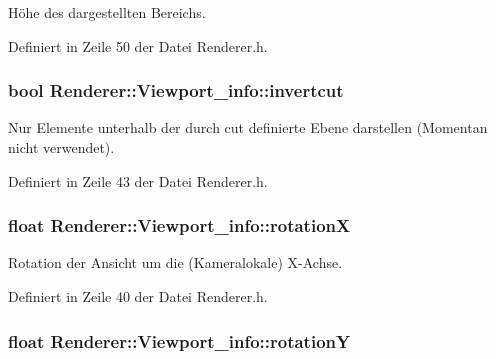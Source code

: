 Höhe des dargestellten Bereichs. 



Definiert in Zeile 50 der Datei Renderer.\-h.

\hypertarget{structRenderer_1_1Viewport__info_a0e06e17e13e9639179de762f6a45c71e}{
\subsubsection[{invertcut}]{\setlength{\rightskip}{0pt plus 5cm}bool Renderer\-::\-Viewport\-\_\-info\-::invertcut}}\label{structRenderer_1_1Viewport__info_a0e06e17e13e9639179de762f6a45c71e}


Nur Elemente unterhalb der durch cut definierte Ebene darstellen (Momentan nicht verwendet). 



Definiert in Zeile 43 der Datei Renderer.\-h.

\hypertarget{structRenderer_1_1Viewport__info_ad8005e4eaa631f4c6b96cf6be05e8428}{
\subsubsection[{rotation\-X}]{\setlength{\rightskip}{0pt plus 5cm}float Renderer\-::\-Viewport\-\_\-info\-::rotation\-X}}\label{structRenderer_1_1Viewport__info_ad8005e4eaa631f4c6b96cf6be05e8428}


Rotation der Ansicht um die (Kameralokale) X-\/\-Achse. 



Definiert in Zeile 40 der Datei Renderer.\-h.

\hypertarget{structRenderer_1_1Viewport__info_a80fe2d86956d26105dd8301278e0c4e6}{
\subsubsection[{rotation\-Y}]{\setlength{\rightskip}{0pt plus 5cm}float Renderer\-::\-Viewport\-\_\-info\-::rotation\-Y}}\label{structRenderer_1_1Viewport__info_a80fe2d86956d26105dd8301278e0c4e6}


